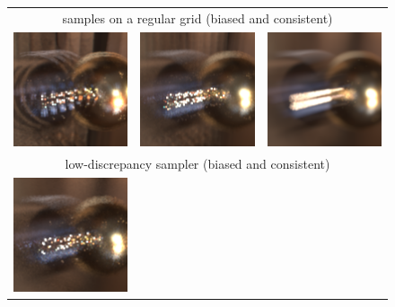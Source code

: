 \begin{figure}
\begin{tabular}{c c c}
\multicolumn{3}{c}{samples on a regular grid (biased and consistent)}\\
  \includegraphics[width=.3\linewidth]{../PBRTOut/pngs/testmb_ball.scene_GRID_2_Samps_iter_1_1_uj.exr.png}&
  \includegraphics[width=.3\linewidth]{../PBRTOut/pngs/testmb_ball.scene_GRID_4_Samps_iter_1_1_uj.exr.png}&
  \includegraphics[width=.3\linewidth]{../PBRTOut/pngs/testmb_ball.scene_GRID_64_Samps_iter_1_1_uj.exr.png}\\
  \hline
\multicolumn{3}{c}{low-discrepancy sampler (biased and consistent)}\\
  \includegraphics[width=.3\linewidth]{../PBRTOut/pngs/testmb_ball.scene_LD_4_Samps_iter_1__uj.exr.png}&

\end{tabular}
\end{figure}
